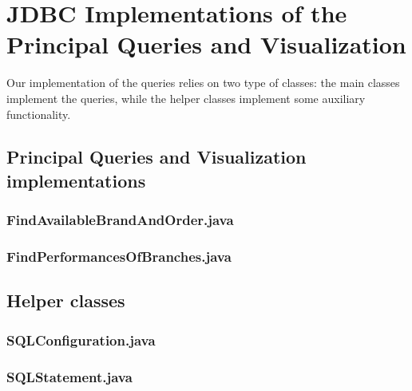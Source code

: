 \section{JDBC Implementations of the Principal Queries and Visualization}
Our implementation of the queries relies on two type of classes: the main classes implement the queries, while the helper classes implement some auxiliary functionality.

\subsection{Principal Queries and Visualization implementations}
\subsubsection{FindAvailableBrandAndOrder.java}
    
\subsubsection{FindPerformancesOfBranches.java}
    

\subsection{Helper classes}
\subsubsection{SQLConfiguration.java}

\subsubsection{SQLStatement.java}
    
